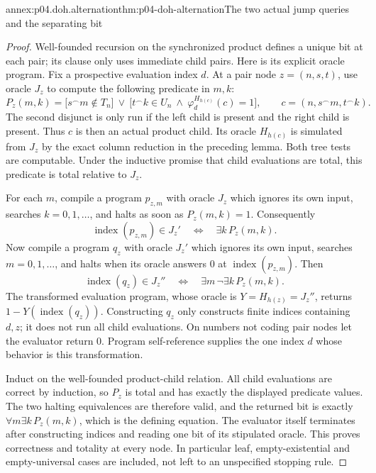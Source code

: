 \begin{annexitem}{annex:p04.doh.alternation}{thm:p04-doh-alternation}{The two actual jump queries and the separating bit}
\begin{proof}
Well-founded recursion on the synchronized product defines a unique
bit at each pair; its clause only uses immediate child pairs.
Here is its explicit oracle program. Fix a prospective evaluation
index \(d\). At a pair node \(z=(n,s,t)\), use oracle \(J_z\)
to compute the following predicate in \(m,k\):
\[
 P_z(m,k)=
 \bigl[s^\frown m\notin T_n\bigr]\ \lor\
 \bigl[t^\frown k\in U_n\ \land\
     \varphi_d^{H_{h(c)}}(c)=1\bigr],
 \qquad c=(n,s^\frown m,t^\frown k).
\]
The second disjunct is only run if the left child is present and
the right child is present. Thus \(c\) is then an actual product
child. Its oracle \(H_{h(c)}\) is simulated from \(J_z\) by
the exact column reduction in the preceding lemma. Both tree tests
are computable. Under the inductive promise that child evaluations
are total, this predicate is total relative to \(J_z\).

For each \(m\), compile a program \(p_{z,m}\) with oracle \(J_z\)
which ignores its own input, searches \(k=0,1,\ldots\), and halts
as soon as \(P_z(m,k)=1\). Consequently
\[
 \operatorname{index}(p_{z,m})\in J_z'
       \quad\Longleftrightarrow\quad\exists k\,P_z(m,k).
\]
Now compile a program \(q_z\) with oracle \(J_z'\) which ignores
its own input, searches \(m=0,1,\ldots\), and halts when its oracle
answers \(0\) at \(\operatorname{index}(p_{z,m})\). Then
\[
 \operatorname{index}(q_z)\in J_z''
       \quad\Longleftrightarrow\quad
       \exists m\,\neg\exists k\,P_z(m,k).
\]
The transformed evaluation program, whose oracle is
\(Y=H_{h(z)}=J_z''\), returns
\(1-Y(\operatorname{index}(q_z))\). Constructing \(q_z\)
only constructs finite indices containing \(d,z\); it does not
run all child evaluations. On numbers not coding pair nodes let
the evaluator return \(0\). Program self-reference supplies the
one index \(d\) whose behavior is this transformation.

Induct on the well-founded product-child relation. All child evaluations
are correct by induction, so \(P_z\) is total and has exactly the
displayed predicate values. The two halting equivalences are therefore
valid, and the returned bit is exactly \(\forall m\exists k\,P_z(m,k)\),
which is the defining equation. The evaluator itself terminates after
constructing indices and reading one bit of its stipulated oracle.
This proves correctness and totality at every node. In particular
leaf, empty-existential and empty-universal cases are included, not
left to an unspecified stopping rule.


\end{proof}
\end{annexitem}
